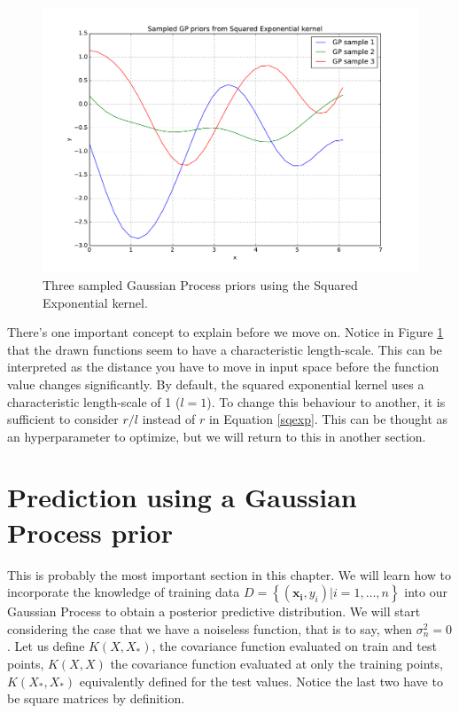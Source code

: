 \documentclass[10pt,a4paper,twoside]{book}
\begin{document}
\begin{figure}
\caption{Three sampled Gaussian Process priors using the Squared Exponential kernel.}
\label{fig:drawPrior}
\includegraphics[width=\textwidth]{figures/chapter2/drawPrior}
\end{figure}

There's one important concept to explain before we move on. Notice in Figure \ref{fig:drawPrior} that the drawn functions seem to have a characteristic length-scale. This can be interpreted as the distance you have to move in input space before the function value changes significantly. By default, the squared exponential kernel uses a characteristic length-scale of 1 ($l = 1$). To change this behaviour to another, it is sufficient to consider $r/l$ instead of $r$ in Equation \ref{sqexp}. This can be thought as an hyperparameter to optimize, but we will return to this in another section.

\section{Prediction using a Gaussian Process prior}

This is probably the most important section in this chapter. We will learn how to incorporate the knowledge of training data $D = \left\lbrace \left(\boldsymbol{x_i}, y_i\right) | i = 1,\dots,n\right\rbrace$ into our Gaussian Process to obtain a posterior predictive distribution. We will start considering the case that we have a noiseless function, that is to say, when $\sigma^2_n = 0$. Let us define $K(X, X_{*})$, the covariance function evaluated on train and test points, $K(X, X)$ the covariance function evaluated at only the training points, $K(X_{*}, X_{*})$ equivalently defined for the test values. Notice the last two have to be square matrices by definition.\\
\end{document}
